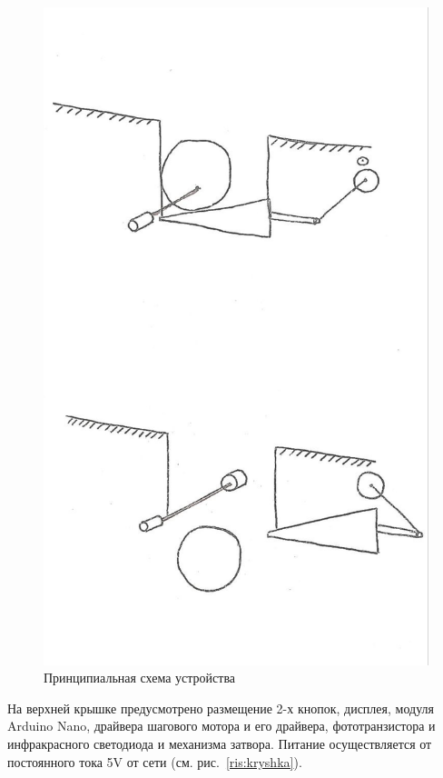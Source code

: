 \begin{figure}[H]
	\centering
	\includegraphics[width=12cm]{scheme_idea.jpg}
	\caption{Принципиальная схема устройства}
	\label{ris:scheme_idea}
\end{figure}
\par\medskip

На верхней крышке предусмотрено размещение 2-х кнопок, дисплея, модуля Arduino Nano, драйвера шагового мотора и его драйвера, фототранзистора и инфракрасного светодиода и механизма затвора. Питание осуществляется от постоянного тока 5V от сети (см. рис.~\ref{ris:kryshka}).  

